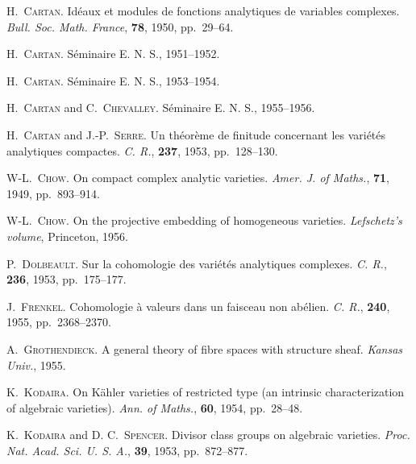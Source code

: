 \begin{enumerate}[label={[\arabic*]},leftmargin=3em]
\item{} H.~\textsc{Cartan}. Idéaux et modules de fonctions analytiques de
variables complexes. \emph{Bull. Soc. Math. France}, \textbf{78}, 1950,
pp.~29--64.

\item{} H.~\textsc{Cartan}. Séminaire E. N. S., 1951--1952.

\item{} H.~\textsc{Cartan}. Séminaire E. N. S., 1953--1954.

\item{} H.~\textsc{Cartan} and C.~\textsc{Chevalley}. Séminaire E. N. S.,
1955--1956.

\item{} H.~\textsc{Cartan} and J.-P.~\textsc{Serre}. Un théorème de finitude
concernant les variétés analytiques compactes. \emph{C. R.}, \textbf{237},
1953, pp.~128--130.

\item{} W-L.~\textsc{Chow}. On compact complex analytic varieties.
\emph{Amer. J. of Maths.}, \textbf{71}, 1949, pp.~893--914.

\item{} W-L.~\textsc{Chow}. On the projective embedding of homogeneous
varieties. \emph{Lefschetz's volume}, Princeton, 1956.

\item{} P.~\textsc{Dolbeault}. Sur la cohomologie des variétés analytiques
complexes. \emph{C. R.}, \textbf{236}, 1953, pp.~175--177.

\item{} J.~\textsc{Frenkel}. Cohomologie à valeurs dans un faisceau non
abélien. \emph{C. R.}, \textbf{240}, 1955, pp.~2368--2370.

\item{} A.~\textsc{Grothendieck}. A general theory of fibre spaces with
structure sheaf. \emph{Kansas Univ.}, 1955.

\item{} K.~\textsc{Kodaira}. On Kähler varieties of restricted type (an
intrinsic characterization of algebraic varieties). \emph{Ann. of Maths.},
\textbf{60}, 1954, pp.~28--48.

\item{} K.~\textsc{Kodaira} and D. C.~\textsc{Spencer}. Divisor class groups
on algebraic varieties. \emph{Proc. Nat. Acad. Sci. U. S. A.}, \textbf{39},
1953, pp.~872--877.


\end{enumerate}
